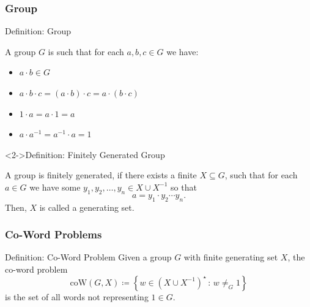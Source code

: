 \documentclass[11pt]{beamer}
\begin{document}

\begin{frame}
\frametitle{Group}

\begin{block}{Definition: Group}

A group $G$ is such that for each $a,b,c \in G$ we have:

\begin{itemize}
	\item {}
	    $a \cdot b \in G$ 
	\item {}
	    $a \cdot b \cdot c = (a \cdot b) \cdot c = a \cdot (b \cdot c)$
	\item {}
		$1 \cdot a = a \cdot 1 = a$
	\item {}
		$a \cdot a^{-1} = a^{-1} \cdot a = 1$
\end{itemize}

\end{block}

\begin{block}<2->{Definition: Finitely Generated Group}

A group is finitely generated, if there exists a finite $X \subseteq G$, such that for each $a \in G$ we have some $y_1, y_2,\dots, y_n \in X \cup X^{-1}$ so that
\[
	a = y_1 \cdot y_2 \cdots y_n.
\]
Then, $X$ is called a generating set.

\end{block}

\end{frame}


\begin{frame}
\frametitle{Co-Word Problems}

\begin{block}{Definition: Co-Word Problem}
Given a group $G$ with finite generating set $X$, the co-word problem
\[
	\mathrm{coW}(G,X)
	\coloneqq
	\left\{
	w \in \left(X \cup X^{-1} \right)^\star
	\, :\,
	w \neq_G 1
	\right\}
\]
is the set of all words not representing $1 \in G$.
\end{block}

\end{frame}
\end{document}
